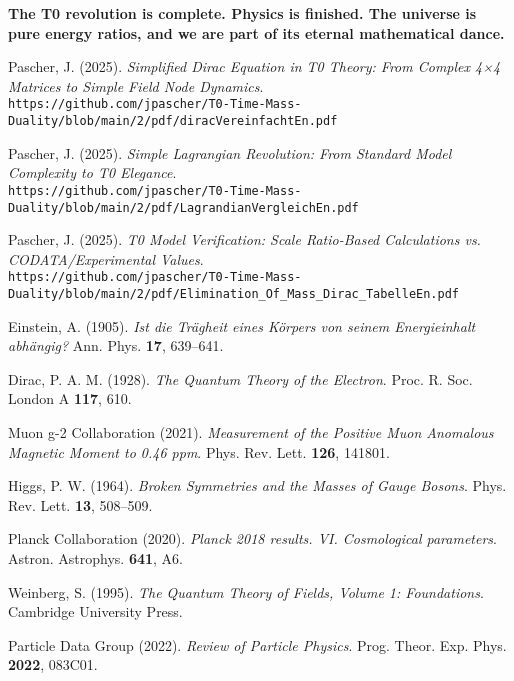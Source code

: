 \documentclass[12pt,a4paper]{article}
\theoremstyle{definition}
\theoremstyle{remark}
\begin{document}
															\textbf{The T0 revolution is complete. Physics is finished. The universe is pure energy ratios, and we are part of its eternal mathematical dance.}
															
															\begin{thebibliography}{99}
																Pascher, J. (2025). \textit{Simplified Dirac Equation in T0 Theory: From Complex 4×4 Matrices to Simple Field Node Dynamics}. \\
																\texttt{https://github.com/jpascher/T0-Time-Mass-Duality/blob/main/2/pdf/diracVereinfachtEn.pdf}
																
																Pascher, J. (2025). \textit{Simple Lagrangian Revolution: From Standard Model Complexity to T0 Elegance}. \\
																\texttt{https://github.com/jpascher/T0-Time-Mass-Duality/blob/main/2/pdf/LagrandianVergleichEn.pdf}
																
																Pascher, J. (2025). \textit{T0 Model Verification: Scale Ratio-Based Calculations vs. CODATA/Experimental Values}. \\
																\texttt{https://github.com/jpascher/T0-Time-Mass-Duality/blob/main/2/pdf/Elimination\_Of\_Mass\_Dirac\_TabelleEn.pdf}
																
																Einstein, A. (1905). \textit{Ist die Trägheit eines Körpers von seinem Energieinhalt abhängig?} Ann. Phys. \textbf{17}, 639--641.
																
																Dirac, P. A. M. (1928). \textit{The Quantum Theory of the Electron}. Proc. R. Soc. London A \textbf{117}, 610.
																
																Muon g-2 Collaboration (2021). \textit{Measurement of the Positive Muon Anomalous Magnetic Moment to 0.46 ppm}. Phys. Rev. Lett. \textbf{126}, 141801.
																
																Higgs, P. W. (1964). \textit{Broken Symmetries and the Masses of Gauge Bosons}. Phys. Rev. Lett. \textbf{13}, 508--509.
																
																Planck Collaboration (2020). \textit{Planck 2018 results. VI. Cosmological parameters}. Astron. Astrophys. \textbf{641}, A6.
																
																Weinberg, S. (1995). \textit{The Quantum Theory of Fields, Volume 1: Foundations}. Cambridge University Press.
																
																Particle Data Group (2022). \textit{Review of Particle Physics}. Prog. Theor. Exp. Phys. \textbf{2022}, 083C01.
															\end{thebibliography}
															
														
\end{document}
